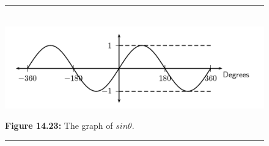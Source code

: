 \begin{figure}[H] %
\begin{center}
\rule[.1in]{\figurerulewidth}{.005in} \\
\label{m39414*uid31!!!underscore!!!media}\label{m39414*uid31!!!underscore!!!printimage}\includegraphics{col11306.imgs/m39414_MG10C15_017.png} %
\vspace{2pt}
\vspace{\rubberspace}\par \begin{cnxcaption}
\small \textbf{Figure 14.23: }The graph of $sin\theta $.
\end{cnxcaption}
\vspace{.1in}
\rule[.1in]{\figurerulewidth}{.005in} \\
\end{center}
\end{figure}       

